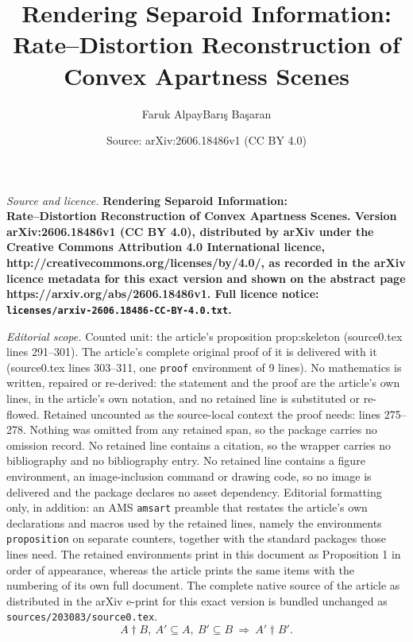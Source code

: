\documentclass[10pt,a4paper]{amsart}
\title{\bfseries Rendering Separoid Information:\\[2pt] Rate--Distortion Reconstruction of Convex Apartness Scenes}
\author{Faruk Alpay\quad Bar\i{}\c{s} Ba\c{s}aran}
\date{Source: arXiv:2606.18486v1 (CC BY 4.0)}
\newcommand{\sep}{\dagger}
\begin{document}
\maketitle

\noindent\emph{Source and licence.} \bfseries Rendering Separoid Information:\\[2pt] Rate--Distortion Reconstruction of Convex Apartness Scenes. Version arXiv:2606.18486v1 (CC BY 4.0), distributed by arXiv under the Creative Commons Attribution 4.0 International licence, http://creativecommons.org/licenses/by/4.0/, as recorded in the arXiv licence metadata for this exact version and shown on the abstract page https://arxiv.org/abs/2606.18486v1. Full licence notice: \texttt{licenses/arxiv-2606.18486-CC-BY-4.0.txt}.\par\smallskip

\noindent\textit{Editorial scope.} Counted unit: the article's proposition prop:skeleton (source0.tex lines 291--301). The article's complete original proof of it is delivered with it (source0.tex lines 303--311, one \texttt{proof} environment of 9 lines). No mathematics is written, repaired or re-derived: the statement and the proof are the article's own lines, in the article's own notation, and no retained line is substituted or re-flowed.  Retained uncounted as the source-local context the proof needs: lines 275--278.  Nothing was omitted from any retained span, so the package carries no omission record.  No retained line contains a citation, so the wrapper carries no bibliography and no bibliography entry.  No retained line contains a figure environment, an image-inclusion command or drawing code, so no image is delivered and the package declares no asset dependency.  Editorial formatting only, in addition: an AMS \texttt{amsart} preamble that restates the article's own declarations and macros used by the retained lines, namely the environments \texttt{proposition} on separate counters, together with the standard packages those lines need.  The retained environments print in this document as Proposition 1 in order of appearance, whereas the article prints the same items with the numbering of its own full document.  The complete native source of the article as distributed in the arXiv e-print for this exact version is bundled unchanged as \texttt{sources/203083/source0.tex}.
\begin{equation}
  A\sep B,\ A'\subseteq A,\ B'\subseteq B \ \Longrightarrow\ A'\sep B'.
  \label{eq:downclosed}
\end{equation}
\end{document}
